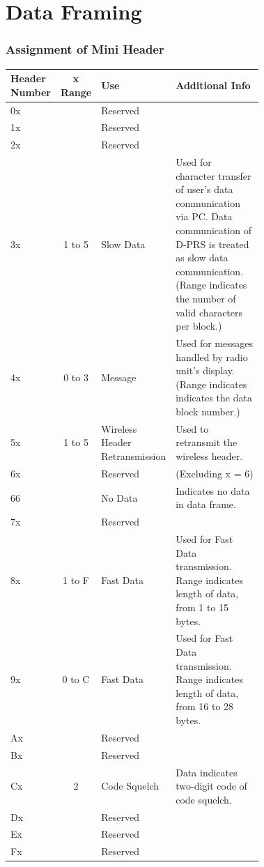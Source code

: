 \documentclass[10pt]{report}
\begin{document}
\setcounter{chapter}{5}
\chapter{Data Framing}

\setcounter{section}{1}
\setcounter{subsection}{2}
\subsection{Assignment of Mini Header} \label{mini-header}

\begin{table}[h]
  \begin{tabular}{|p{0.07\linewidth}|c|p{0.15\linewidth}|p{0.5\linewidth}|}
    \hline
    Header Number & x Range & Use & Additional Info \\
    \hline
    \hline
    0x &        & Reserved & \\ \hline
    1x &        & Reserved & \\ \hline
    2x &        & Reserved & \\ \hline
    
    3x & 1 to 5 & Slow Data & Used for character transfer of user's
    data communication via PC.  Data communication of D-PRS is treated
    as slow data communication.  (Range indicates the number of valid
    characters per block.) \\ \hline

    4x & 0 to 3 & Message & Used for messages handled by radio unit's
    display.  (Range indicates indicates the data block number.) \\

    5x & 1 to 5 & Wireless Header Retransmission & Used to retransmit
    the wireless header. \\ \hline

    6x &        & Reserved & (Excluding x = 6) \\ \hline
    66 &        & No Data  & Indicates no data in data frame. \\ \hline
    7x &        & Reserved & \\ \hline
    
    8x & 1 to F & Fast Data & Used for Fast Data transmission.  Range
    indicates length of data, from 1 to 15 bytes. \\ \hline
    
    9x & 0 to C & Fast Data & Used for Fast Data transmission.  Range
    indicates length of data, from 16 to 28 bytes. \\ \hline

    Ax &        & Reserved & \\ \hline
    Bx &        & Reserved & \\ \hline

    Cx & 2      & Code Squelch & Data indicates two-digit code of code
    squelch. \\ \hline

    Dx &        & Reserved & \\ \hline
    Ex &        & Reserved & \\ \hline
    Fx &        & Reserved & \\ \hline
  \end{tabular}
\end{table}
\end{document}
